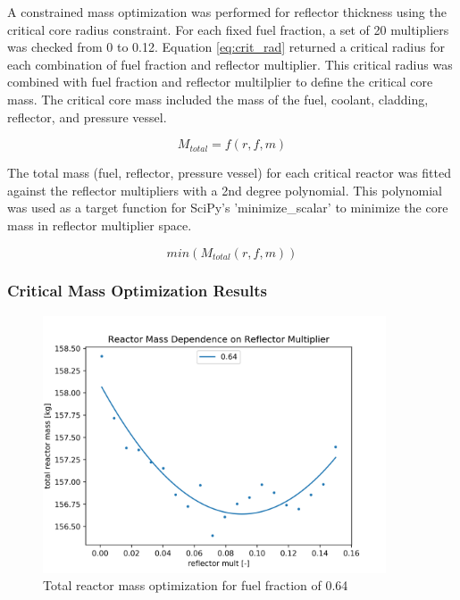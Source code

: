 A constrained mass optimization was performed for reflector thickness using the
critical core radius constraint. For each fixed fuel fraction, a set of 20 multipliers was
checked from 0 to 0.12. Equation \ref{eq:crit_rad} returned a critical radius for
each combination of fuel fraction and reflector multiplier. This critical radius
was combined with fuel fraction and reflector multilplier to define the critical
core mass. The critical core mass included the mass of the fuel, coolant, cladding, 
reflector, and pressure vessel.

\begin{equation}
    M_{total} = f(r, f, m)
\end{equation}

The total mass (fuel, reflector, pressure vessel) for each critical
reactor was fitted against the reflector multipliers with a 2nd degree
polynomial. This polynomial was used as a target function for SciPy's
'minimize\_scalar' to minimize the core mass in reflector multiplier space.

\begin{equation}
    min( M_{total}(r, f, m) )
\end{equation}

\subsubsection{Critical Mass Optimization Results}

\begin{figure}[h]
    \centering
    \includegraphics[width=4in]{../images/mass_mult_064.png}
\caption{Total reactor mass optimization for fuel fraction of 0.64}
\label{fig:mass_mult_one}
\end{figure}

